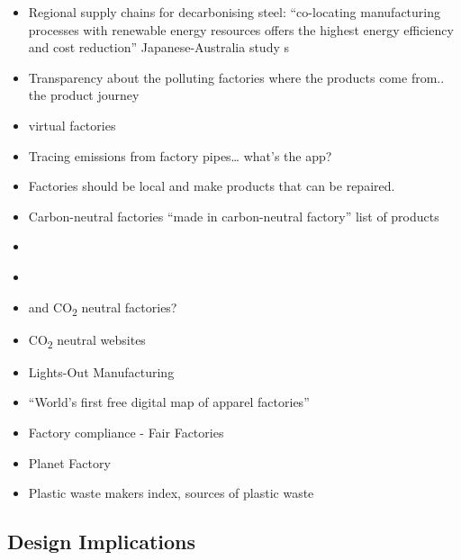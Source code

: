 \documentclass[
  letterpaper,
  DIV=11,
  numbers=noendperiod]{scrartcl}
\begin{document}
\begin{itemize}
\item
  Regional supply chains for decarbonising steel: ``co-locating
  manufacturing processes with renewable energy resources offers the
  highest energy efficiency and cost reduction'' Japanese-Australia
  study s \citet{devlinRegionalSupplyChains2022}
\item
  Transparency about the polluting factories where the products come
  from.. the product journey
\item
  virtual factories
\item
  Tracing emissions from factory pipes\ldots{} what's the app?
\item
  Factories should be local and make products that can be repaired.
\item
  Carbon-neutral factories ``made in carbon-neutral factory'' list of
  products
\item
  \citet{stefanklebertCarbonneutralManufacturingPossible2022}
\item
  \citet{vdizentrumressourceneffizienzCarbonneutralGreenFactory2020}
\item
  \citet{CO2neutralFactories} and \citet{InnocentOpens200m}
  CO\textsubscript{2} neutral factories?
\item
  \citep{MakeYourWebsite, Ecograder} CO\textsubscript{2} neutral
  websites
\item
  \citet{ericfoggWhatLightsOut2020} Lights-Out Manufacturing
\item
  \citet{mowbrayWorldFirstFree2018} ``World's first free digital map of
  apparel factories''
\item
  \citet{FFCFairFactories} Factory compliance - Fair Factories
\item
  Planet Factory
\item
  \citet{CompaniesWeHave} Plastic waste makers index, sources of plastic
  waste
\end{itemize}

\subsection{Design Implications}\label{design-implications-1}
\end{document}
